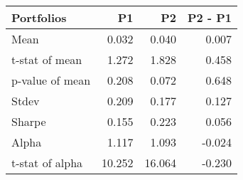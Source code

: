 \begin{tabular}{lrrr}
\toprule
Portfolios & P1 & P2 & P2 - P1 \\
\midrule
Mean & 0.032 & 0.040 & 0.007 \\
t-stat of mean & 1.272 & 1.828 & 0.458 \\
p-value of mean & 0.208 & 0.072 & 0.648 \\
Stdev & 0.209 & 0.177 & 0.127 \\
Sharpe & 0.155 & 0.223 & 0.056 \\
Alpha & 1.117 & 1.093 & -0.024 \\
t-stat of alpha & 10.252 & 16.064 & -0.230 \\
\bottomrule
\end{tabular}
